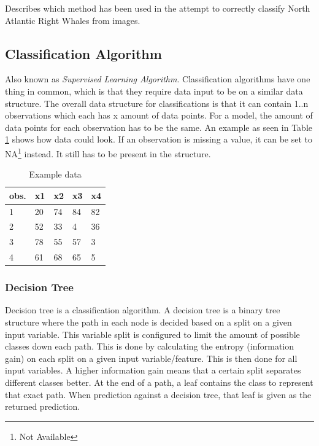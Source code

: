 Describes which method has been used in the attempt to correctly classify North Atlantic Right Whales from images.

\subsection{Classification Algorithm}
Also known as \emph{Supervised Learning Algorithm}. Classification algorithms have one thing in common, which is that they require data input to be on a similar data structure.
The overall data structure for classifications is that it can contain 1..n observations which each has x amount of data points. For a model, the amount of data points for each observation has to be the same. An example as seen in Table \ref{tab:example data} shows how data could look.
If an observation is missing a value, it can be set to NA\footnote{Not Available} instead. It still has to be present in the structure.

\begin{table}
  \centering
  \caption{Example data}
  \label{tab:example data}
  \begin{tabularx}{\linewidth}{|l|X|X|X|X|} \hline
    obs. & x1 & x2 & x3 & x4 \\ \hline
    1    & 20 & 74 & 84 & 82 \\ \hline
    2    & 52 & 33 & 4  & 36 \\ \hline
    3    & 78 & 55 & 57 & 3  \\ \hline
    4    & 61 & 68 & 65 & 5  \\ \hline
  \end{tabularx}
\end{table}

\subsubsection{Decision Tree}
Decision tree is a classification algorithm. 
A decision tree is a binary tree structure where the path in each node is decided based on a split on a given input variable.
This variable split is configured to limit the amount of possible classes down each path. This is done by calculating the entropy (information gain) on each split on a given input variable/feature. This is then done for all input variables. A higher information gain means that a certain split separates different classes better.  
At the end of a path, a leaf contains the class to represent that exact path.
When prediction against a decision tree, that leaf is given as the returned prediction.

